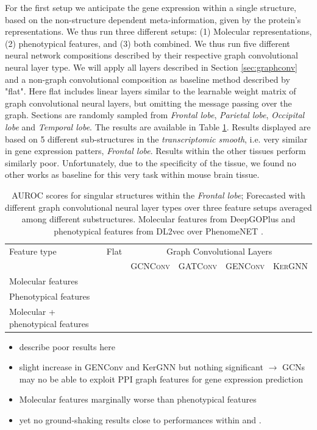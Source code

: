 \documentclass[]{article}
\renewcommand{\cite}{\citep}
\begin{document}
For the first setup we anticipate the gene expression within a single structure, based on the non-structure dependent meta-information, given by the protein's representations. We thus run three different setups: (1) Molecular representations, (2) phenotypical features, and (3) both combined. We thus run five different neural network compositions described by their respective graph convolutional neural layer type. We will apply all layers described in Section \ref{sec:graphconv} and a non-graph convolutional composition as baseline method described by "flat". Here flat includes linear layers similar to the learnable weight matrix of graph convolutional neural layers, but omitting the message passing over the graph. Sections are randomly sampled from \textit{Frontal lobe}, \textit{Parietal lobe}, \textit{Occipital lobe } and \textit{Temporal lobe}. The results are available in Table \ref{tab:geneexp_pred}. Results displayed are based on 5 different sub-structures in the \textit{transcriptomic smooth}, i.e. very similar in gene expression patters, \textit{Frontal lobe}. Results within the other tissues perform similarly poor. Unfortunately, due to the specificity of the tissue, we found no other works as baseline for this very task within mouse brain tissue.

\begin{table}
	\centering
	\renewcommand{\arraystretch}{1.5}
	\begin{tabular}{l|lllll}
		Feature type&Flat&\multicolumn{4}{|c}{Graph Convolutional Layers}\\
		&&\multicolumn{1}{|l}{\textsc{GCNConv}}&\textsc{GATConv}&\textsc{GENConv}&\textsc{KerGNN}\\
		\hline
		Molecular features&&&&&\\
		Phenotypical features&&&&&\\
		Molecular + phenotypical features &&&&&\\
	\end{tabular}
	\label{tab:geneexp_pred}
	\caption{AUROC scores for singular structures within the \textit{Frontal lobe}; Forecasted with different graph convolutional neural layer types over three feature setups averaged among different substructures. Molecular features from DeepGOPlus \cite{DeepGoPlus} and phenotypical features from DL2vec \cite{DL2vec2020} over PhenomeNET \cite{PhenomeNET2011}. }
\end{table}

\begin{itemize}
	\item describe poor results here
	\item slight increase in GENConv and KerGNN but nothing significant $\rightarrow$ GCNs may no be able to exploit PPI graph features for gene expression prediction
	\item Molecular features marginally worse than phenotypical features
	\item yet no ground-shaking results close to performances within \citet{schulte2021integration} and \citet{wang2021mogonet}.
\end{itemize}
\end{document}
